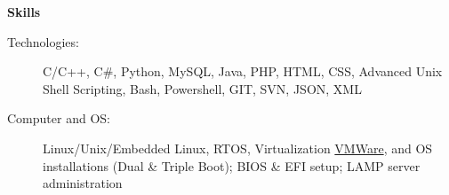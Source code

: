 \documentclass[letterpaper,11pt]{article}
\newcommand{\resheading}[1]{{\large \colorbox{mygrey}{\begin{minipage}{\textwidth}{\textbf{#1 \vphantom{p\^{E}}}}\end{minipage}}}}
\begin{document}
\resheading{{Skills}}
	\begin{description}
		\item[Technologies:] { \footnotesize C/C++,
			C\#, Python, MySQL, Java, PHP, HTML, CSS,
			Advanced Unix Shell Scripting, Bash, Powershell,
			GIT, SVN, JSON, XML
		}
		\item[Computer and OS:] { \footnotesize
			Linux/Unix/Embedded Linux, RTOS,
			Virtualization
		 \href{http://www.vmware.com}{VMWare},
			and  OS installations
			(Dual \& Triple Boot);	BIOS \& EFI setup; LAMP server administration
		}



                   

\end{description}
\end{document}
